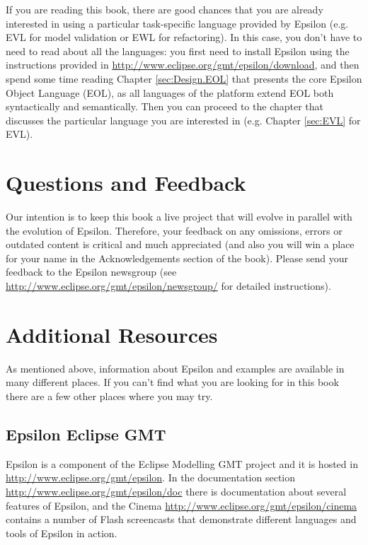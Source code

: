 If you are reading this book, there are good chances that you are already interested in using a particular task-specific language provided by Epsilon (e.g. EVL for model validation or EWL for refactoring). In this case, you don't have to need to read about all the languages: you first need to install Epsilon using the instructions provided in \url{http://www.eclipse.org/gmt/epsilon/download}, and then spend some time reading Chapter \ref{sec:Design.EOL} that presents the core Epsilon Object Language (EOL), as all languages of the platform extend EOL both syntactically and semantically. Then you can proceed to the chapter that discusses the particular language you are interested in (e.g. Chapter \ref{sec:EVL} for EVL).

\section{Questions and Feedback}

Our intention is to keep this book a live project that will evolve in parallel with the evolution of Epsilon. Therefore, your feedback on any omissions, errors or outdated content is critical and much appreciated (and also you will win a place for your name in the Acknowledgements section of the book). Please send your feedback to the Epsilon newsgroup  (see \url{http://www.eclipse.org/gmt/epsilon/newsgroup/} for detailed instructions).

\section{Additional Resources}

As mentioned above, information about Epsilon and examples are available in many different places. If you can't find what you are looking for in this book there are a few other places where you may try.

\subsection{Epsilon Eclipse GMT}
Epsilon is a component of the Eclipse Modelling GMT project and it is hosted in \url{http://www.eclipse.org/gmt/epsilon}. In the documentation section \url{http://www.eclipse.org/gmt/epsilon/doc} there is documentation about several features of Epsilon, and the Cinema \url{http://www.eclipse.org/gmt/epsilon/cinema} contains a number of Flash screencasts that demonstrate different languages and tools of Epsilon in action.

